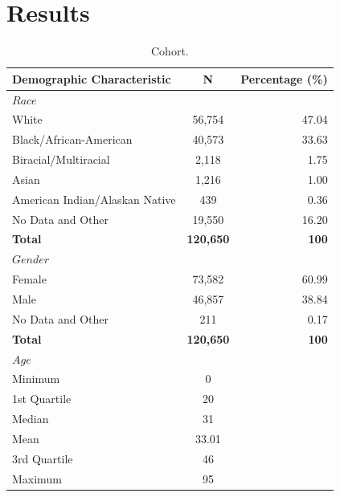 \documentclass[twoside,10.5pt]{article}
\begin{document}
\section{Results}

\begin{table}[h!]
  \begin{center}
    \caption{Cohort.}
    \label{tab:table1}
    \begin{tabular}{l|c|r} %
      \textbf{Demographic Characteristic} & \textbf{N} & \textbf{Percentage (\%)}\\
      \hline
      $Race$ & $ $ & $ $ \\
      White & 56,754 & 47.04\\
      Black/African-American & 40,573 & 33.63\\
      Biracial/Multiracial & 2,118 & 1.75\\
      Asian & 1,216 & 1.00\\
      American Indian/Alaskan Native & 439 & 0.36\\
      No Data and Other & 19,550 & 16.20\\
      \textbf{Total} & \textbf{120,650} & \textbf{100}\\
      \hline
      $Gender$ & $ $ & $ $ \\
      Female & 73,582 & 60.99\\
      Male & 46,857 & 38.84\\
      No Data and Other & 211 & 0.17\\
      \textbf{Total} & \textbf{120,650} & \textbf{100}\\
      $Age$ & $ $ & $ $\\
      Minimum & 0 & \\
      1st Quartile & 20 & \\
      Median & 31 &  \\
      Mean & 33.01 &   \\
      3rd Quartile & 46 &  \\
      Maximum & 95 &   \\
    \end{tabular}
  \end{center}
\end{table}
\end{document}
